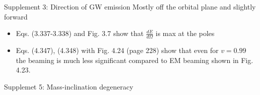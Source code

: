 \documentclass[xcolor=dvipsnames,handout,t]{beamer}
\begin{document}
\begin{frame}{Supplement 3: Direction of GW emission}
 Mostly off the orbital plane and slightly forward
 \begin{itemize}
  \item Eqs. (3.337-3.338) and Fig. 3.7 show that $\tfrac{d\dot{E}}{d\Omega}$ is max at the poles
  \item Eqs. (4.347), (4.348) with Fig. 4.24 (page 228) show that even for $v=0.99$ the beaming
  is much less significant compared to EM beaming shown in Fig. 4.23.
 \end{itemize}

\end{frame}


\begin{frame}{Supplemet 5: Mass-inclination degeneracy}
 
\end{frame}
\end{document}
